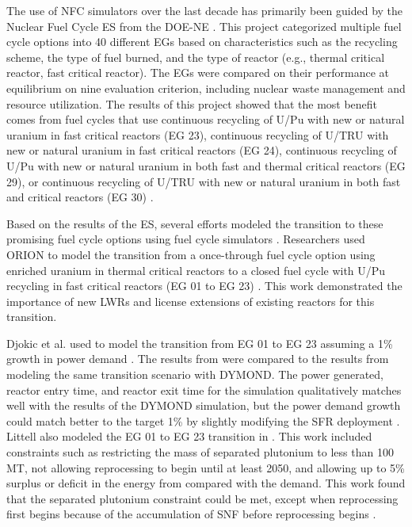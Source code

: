 The use of \gls{NFC} simulators over the 
last decade has primarily been guided by the Nuclear Fuel Cycle \gls{ES} 
from the \gls{DOE-NE} \cite{wigeland_nuclear_2014}. This project
categorized multiple fuel cycle options into 40 different \glspl{EG} 
based on characteristics such as the recycling scheme, the type of fuel 
burned, 
and the type of reactor (e.g., thermal critical reactor, fast critical reactor). 
The \glspl{EG} were compared on their performance at equilibrium on nine evaluation 
criterion, including nuclear waste management and resource utilization. The 
results of this project showed that the most benefit comes from fuel cycles 
that use continuous recycling of U/Pu with new or natural uranium in fast critical 
reactors (\gls{EG} 23), continuous recycling of U/\gls{TRU} with new or natural 
uranium in fast critical reactors (\gls{EG} 24), continuous recycling of U/Pu 
with new or natural uranium in both fast and thermal critical reactors 
(\gls{EG} 29), or continuous recycling of U/\gls{TRU} with new or natural uranium in 
both fast and critical reactors (\gls{EG} 30) \cite{wigeland_nuclear_2014}. 

Based on the results of the \gls{ES}, several efforts modeled 
the transition to these promising fuel cycle options using fuel cycle 
simulators \cite{sunny_transition_2015,djokic_application_2015,feng_standardized_2016,bae_standardized_2019,littell_development_2016}. 
Researchers used ORION to model the transition from a 
once-through fuel cycle option using enriched uranium in thermal critical 
reactors to a closed fuel cycle with U/Pu recycling in fast 
critical reactors (\gls{EG} 01 to \gls{EG} 23) \cite{sunny_transition_2015}.
This work 
demonstrated the importance of new \glspl{LWR} and license 
extensions of existing reactors for this transition. 

Djokic et al. used \Cyclus to model the transition from \gls{EG} 01 to \gls{EG} 
23 assuming a 1\% growth in power demand 
\cite{djokic_application_2015}. The results from \Cyclus were compared 
to the results from modeling the same transition scenario with \gls{DYMOND}. 
The power generated, reactor entry 
time, and reactor exit time for the \Cyclus simulation qualitatively 
matches well with the results of the \gls{DYMOND} simulation, but the power 
demand growth could match better to the target 1\% by slightly modifying 
the \gls{SFR} deployment \cite{djokic_application_2015}. Littell 
\cite{littell_development_2016}
also modeled the \gls{EG} 01 to \gls{EG} 23 transition in \Cyclus. 
This work included constraints such as restricting the mass of separated 
plutonium to less than 100 MT, not allowing reprocessing to begin until 
at least 2050, and allowing up to 5\% surplus or deficit in the energy 
from compared with the demand. This work found that the separated 
plutonium constraint could be met, except when reprocessing first 
begins because of the accumulation of \gls{SNF} before 
reprocessing begins \cite{littell_development_2016}. 

